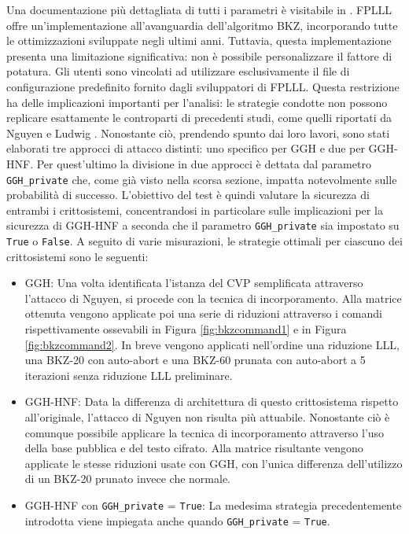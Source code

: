 Una documentazione più dettagliata di tutti i parametri è visitabile in \cite{FPLLL}.
FPLLL offre un'implementazione all'avanguardia dell'algoritmo BKZ, incorporando tutte le 
ottimizzazioni sviluppate negli ultimi anni. Tuttavia, questa implementazione presenta 
una limitazione significativa: non è possibile personalizzare il fattore di potatura. 
Gli utenti sono vincolati ad utilizzare esclusivamente il file di configurazione 
predefinito fornito dagli sviluppatori di FPLLL. 
Questa restrizione ha delle implicazioni importanti per l'analisi: le strategie condotte
non possono replicare esattamente le controparti di 
precedenti studi, come quelli riportati da Nguyen \cite{Nguyen99} e Ludwig \cite{HNF04}.
Nonostante ciò, prendendo spunto dai loro lavori, sono stati elaborati tre approcci 
di attacco distinti: uno specifico per GGH e due per GGH-HNF. Per quest'ultimo la divisione 
in due approcci è dettata dal parametro \texttt{GGH\_private} che, come già visto nella 
scorsa sezione, impatta notevolmente sulle probabilità di successo. 
L'obiettivo del test è quindi valutare la sicurezza di entrambi i crittosistemi, 
concentrandosi in particolare sulle implicazioni per la sicurezza di GGH-HNF a 
seconda che il parametro \texttt{GGH\_private} sia impostato su \texttt{True} o 
\texttt{False}. A seguito di varie misurazioni, le strategie ottimali per ciascuno dei 
crittosistemi sono le seguenti:
\begin{itemize}
    \item GGH: Una volta identificata l'istanza del CVP semplificata attraverso l'attacco di Nguyen, 
    si procede con la tecnica di incorporamento. 
    Alla matrice ottenuta vengono applicate poi una serie di riduzioni attraverso i 
    comandi rispettivamente ossevabili in
    Figura \ref{fig:bkzcommand1} e in Figura \ref{fig:bkzcommand2}. In breve vengono 
    applicati nell'ordine una riduzione LLL, una BKZ-20 con auto-abort e una BKZ-60 prunata
    con auto-abort a 5 iterazioni senza riduzione LLL preliminare. 
    \item GGH-HNF: Data la differenza di 
    architettura di questo crittosistema rispetto all'originale, 
    l'attacco di Nguyen non risulta più attuabile. Nonostante ciò 
    è comunque possibile applicare la tecnica di incorporamento attraverso l'uso della 
    base pubblica e del testo cifrato. Alla matrice risultante vengono applicate le stesse
    riduzioni usate con GGH, con l'unica differenza dell'utilizzo di un BKZ-20 prunato invece
    che normale. 
    \item GGH-HNF con \texttt{GGH\_private} = \texttt{True}: La medesima strategia 
    precedentemente introdotta viene impiegata anche quando \texttt{GGH\_private} = \texttt{True}. 
\end{itemize}


